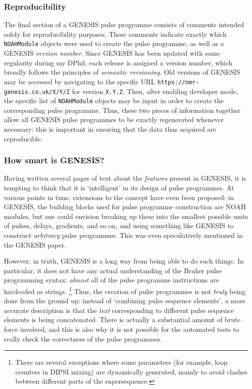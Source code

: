 \subsubsection{Reproducibility}

The final section of a GENESIS pulse programme consists of comments intended solely for reproducibility purposes.
These comments indicate exactly which \texttt{NOAHModule} objects were used to create the pulse programme, as well as a GENESIS \textit{version number}.
Since GENESIS has been updated with some regularity during my DPhil, each release is assigned a version number, which broadly follows the principles of \textit{semantic versioning}.
Old versions of GENESIS may be accessed by navigating to the specific URL \texttt{https://nmr-genesis.co.uk/X/Y/Z} for version \texttt{X.Y.Z}.
Then, after enabling developer mode, the specific list of \texttt{NOAHModule} objects may be input in order to create the corresponding pulse programme.
Thus, these two pieces of information together allow all GENESIS pulse programmes to be exactly regenerated whenever necessary: this is important in ensuring that the data thus acquired are reproducible.


\subsubsection{How smart is GENESIS?}

Having written several pages of text about the \textit{features} present in GENESIS, it is tempting to think that it is `intelligent' in its design of pulse programmes.
At various points in time, extensions to the concept have even been proposed: in GENESIS, the building blocks used for pulse programme construction are NOAH modules, but one could envision breaking up these into the smallest possible units of pulses, delays, gradients, and so on, and using something like GENESIS to construct \textit{arbitrary} pulse programmes.
This was even speculatively mentioned in the GENESIS paper\autocite{Yong2022AC}.

However, in truth, GENESIS is a long way from being able to do such things.
In particular, it does not have any actual understanding of the Bruker pulse programming syntax: \textit{almost} all of the pulse programme instructions are hardcoded as strings.%
\footnote{There are several exceptions where some parameters (for example, loop counters in DIPSI mixing) are dynamically generated, mainly to avoid clashes between different parts of the supersequence.}
Thus, the creation of pulse programmes is not \textit{truly} being done from the ground up: instead of `combining pulse sequence elements', a more accurate description is that the \textit{text} corresponding to different pulse sequence elements is being concatenated.
There is actually a substantial amount of brute force involved, and this is also why it is not possible for the automated tests to really check the correctness of the pulse programmes.

